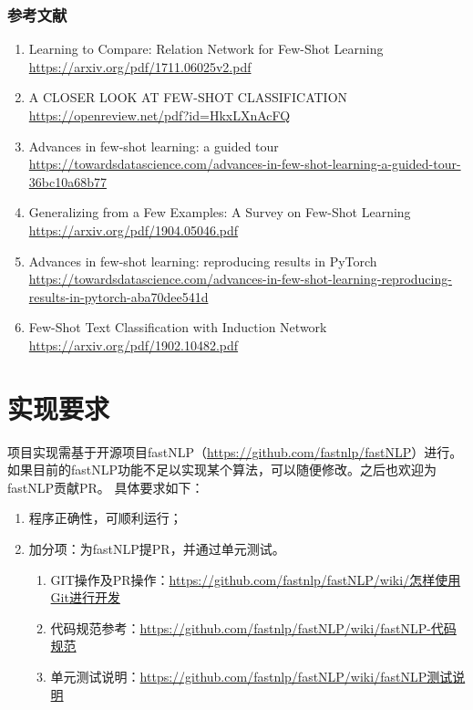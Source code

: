 \documentclass{article}
\begin{document}
\subsubsection{参考文献}
\begin{enumerate}
    \item Learning to Compare: Relation Network for Few-Shot Learning\\
    \url{https://arxiv.org/pdf/1711.06025v2.pdf}
    \item A CLOSER LOOK AT FEW-SHOT CLASSIFICATION\\ \url{https://openreview.net/pdf?id=HkxLXnAcFQ}
    \item Advances in few-shot learning: a guided tour\\ \url{https://towardsdatascience.com/advances-in-few-shot-learning-a-guided-tour-36bc10a68b77}
    \item Generalizing from a Few Examples: A Survey on Few-Shot Learning\\
    \url{https://arxiv.org/pdf/1904.05046.pdf}
    \item Advances in few-shot learning: reproducing results in PyTorch\\ \url{https://towardsdatascience.com/advances-in-few-shot-learning-reproducing-results-in-pytorch-aba70dee541d}
    \item  Few-Shot Text Classification with Induction Network\\ \url{https://arxiv.org/pdf/1902.10482.pdf}
\end{enumerate}

\section{实现要求}

项目实现需基于开源项目fastNLP（\url{https://github.com/fastnlp/fastNLP}）进行。如果目前的fastNLP功能不足以实现某个算法，可以随便修改。之后也欢迎为fastNLP贡献PR。
具体要求如下：
\begin{enumerate}
    \item 程序正确性，可顺利运行；
    \item 加分项：为fastNLP提PR，并通过单元测试。
    \begin{enumerate}
        \item  GIT操作及PR操作：\url{https://github.com/fastnlp/fastNLP/wiki/怎样使用Git进行开发}
        \item 代码规范参考：\url{https://github.com/fastnlp/fastNLP/wiki/fastNLP-代码规范}
        \item 单元测试说明：\url{https://github.com/fastnlp/fastNLP/wiki/fastNLP测试说明}
    \end{enumerate}
\end{enumerate}
\end{document}
